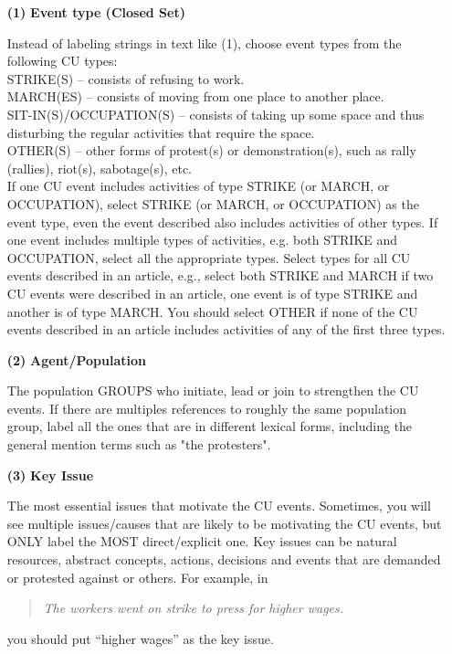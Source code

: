 \begin{enumerate}

\item[{\bf (1)}] {\bf Event type (Closed Set)}

Instead of labeling strings in text like (1), choose
 event types from the following CU types:\\

STRIKE(S) -- consists of refusing to work.\\
MARCH(ES) -- consists of moving from one place to another place.\\
SIT-IN(S)/OCCUPATION(S) -- consists of taking up some space and thus disturbing the 
regular activities that require the space.\\
OTHER(S) -- other forms of protest(s) or demonstration(s), such as rally (rallies), 
riot(s), sabotage(s), etc. \\

If one CU event includes activities of type STRIKE (or MARCH, or OCCUPATION), 
select STRIKE (or MARCH, or OCCUPATION) as the event type, even the event 
described also includes activities of other types. If one event includes 
multiple types of activities, e.g. both STRIKE and OCCUPATION, select all the 
appropriate types. Select types for all CU events described in an article, e.g., 
select both STRIKE and MARCH if two CU events were described in an article, one 
event is of type STRIKE and another is of type MARCH. You should select OTHER 
if none of the CU events described in an article includes activities of any of 
the first three types. 

\item[{\bf (2)}] {\bf Agent/Population}

The population GROUPS who initiate, lead or join to strengthen 
the CU events. If there are multiples references to roughly the same population group, 
label all the ones that are in different lexical forms, including the general mention terms 
such as "the protesters".

\item[{\bf (3)}] {\bf Key Issue} 

The most essential issues that motivate the CU events. 
Sometimes, you will see multiple issues/causes that are likely to be motivating 
the CU events, but ONLY label the MOST direct/explicit one. Key issues can be 
natural resources, abstract concepts, actions, decisions and events that are 
demanded or protested against or others. 
For example, in
  \begin{quote}
 {\em The workers went on strike to press for higher wages.}
  \end{quote}
  you should  put ``higher wages'' as the key issue.
  

\end{enumerate}
